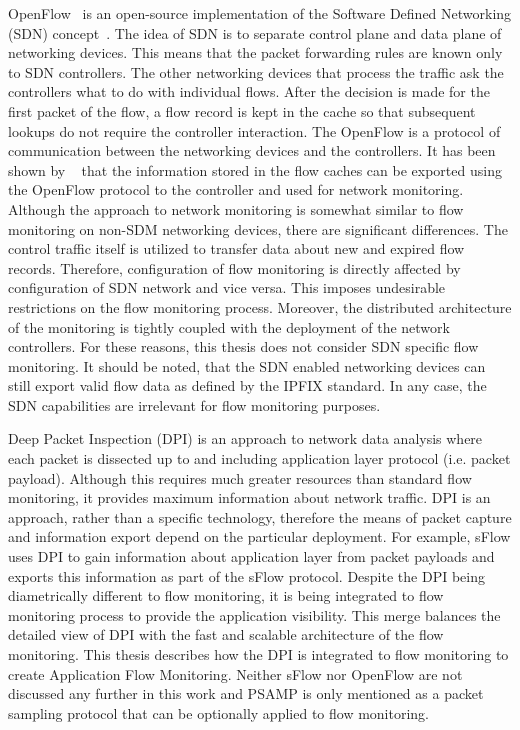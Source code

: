 OpenFlow~\cite{ONF-2012-OpenFlow} is an open-source implementation of the Software Defined Networking (SDN) concept~\cite{Singh-2017-Survey, Hu-2014-Survey}. The idea of SDN is to separate control plane and data plane of networking devices. This means that the packet forwarding rules are known only to SDN controllers. The other networking devices that process the traffic ask the controllers what to do with individual flows. After the decision is made for the first packet of the flow, a flow record is kept in the cache so that subsequent lookups do not require the controller interaction. The OpenFlow is a protocol of communication between the networking devices and the controllers. It has been shown by \citeauthor{Yu-2013-FlowSense}~\cite{Yu-2013-FlowSense} that the information stored in the flow caches can be exported using the OpenFlow protocol to the controller and used for network monitoring. Although the approach to network monitoring is somewhat similar to flow monitoring on non-SDM networking devices, there are significant differences. The control traffic itself is utilized to transfer data about new and expired flow records. Therefore, configuration of flow monitoring is directly affected by configuration of SDN network and vice versa. This imposes undesirable restrictions on the flow monitoring process. Moreover, the distributed architecture of the monitoring is tightly coupled with the deployment of the network controllers. For these reasons, this thesis does not consider SDN specific flow monitoring. It should be noted, that the SDN enabled networking devices can still export valid flow data as defined by the IPFIX standard. In any case, the SDN capabilities are irrelevant for flow monitoring purposes.


Deep Packet Inspection (DPI) is an approach to network data analysis where each packet is dissected up to and including application layer protocol (i.e. packet payload). Although this requires much greater resources than standard flow monitoring, it provides maximum information about network traffic. DPI is an approach, rather than a specific technology, therefore the means of packet capture and information export depend on the particular deployment. For example, sFlow uses DPI to gain information about application layer from packet payloads and exports this information as part of the sFlow protocol. Despite the DPI being diametrically different to flow monitoring, it is being integrated to flow monitoring process to provide the application visibility. This merge balances the detailed view of DPI with the fast and scalable architecture of the flow monitoring. This thesis describes how the DPI is integrated to flow monitoring to create Application Flow Monitoring. Neither sFlow nor OpenFlow are not discussed any further in this work and PSAMP is only mentioned as a packet sampling protocol that can be optionally applied to flow monitoring.


